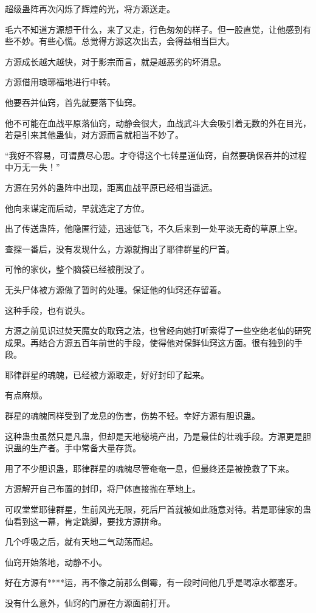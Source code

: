 \begin{this_body}
超级蛊阵再次闪烁了辉煌的光，将方源送走。

毛六不知道方源想干什么，来了又走，行色匆匆的样子。但一股直觉，让他感到有些不妙。有些心慌。总觉得方源这次出去，会得益相当巨大。

方源成长越大越快，对于影宗而言，就是越恶劣的坏消息。

方源借用琅琊福地进行中转。

他要吞并仙窍，首先就要落下仙窍。

他不可能在血战平原落仙窍，动静会很大，血战武斗大会吸引着无数的外在目光，若是引来其他蛊仙，对方源而言就相当不妙了。

“我好不容易，可谓费尽心思。才夺得这个七转星道仙窍，自然要确保吞并的过程中万无一失！”

方源在另外的蛊阵中出现，距离血战平原已经相当遥远。

他向来谋定而后动，早就选定了方位。

出了传送蛊阵，他隐匿行迹，迅速低飞，不久后来到一处平淡无奇的草原上空。

查探一番后，没有发现什么，方源就掏出了耶律群星的尸首。

可怜的家伙，整个脑袋已经被削没了。

无头尸体被方源做了暂时的处理。保证他的仙窍还存留着。

这种手段，也有说头。

方源之前见识过焚天魔女的取窍之法，也曾经向她打听索得了一些空绝老仙的研究成果。再结合方源五百年前世的手段，使得他对保鲜仙窍这方面。很有独到的手段。

耶律群星的魂魄，已经被方源取走，好好封印了起来。

有点麻烦。

群星的魂魄同样受到了龙息的伤害，伤势不轻。幸好方源有胆识蛊。

这种蛊虫虽然只是凡蛊，但却是天地秘境产出，乃是最佳的壮魂手段。方源更是胆识蛊的生产者。手中常备大量存货。

用了不少胆识蛊，耶律群星的魂魄尽管奄奄一息，但最终还是被挽救了下来。

方源解开自己布置的封印，将尸体直接抛在草地上。

可叹堂堂耶律群星，生前风光无限，死后尸首就被如此随意对待。若是耶律家的蛊仙看到这一幕，肯定跳脚，要找方源拼命。

几个呼吸之后，就有天地二气动荡而起。

仙窍开始落地，动静不小。

好在方源有****运，再不像之前那么倒霉，有一段时间他几乎是喝凉水都塞牙。

没有什么意外，仙窍的门扉在方源面前打开。


\end{this_body}
